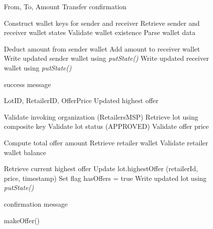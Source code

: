 \documentclass[12pt]{article}
\begin{document}
		\begin{figure}[h]
		\centering
		\caption{Baseline Algorithms Exhibiting MVCC Conflicts in Wallet Updates and Offer Management}
		\label{fig:transferandmakeoffer}
		
		\begin{minipage}[t]{0.48\linewidth}
			\vspace{0pt}
			\centering
			\begin{algorithm}[H]
				\caption{\texttt{\_transfer()}}
				\begin{algorithmic}[1]
					
					\Require From, To, Amount
					\Ensure Transfer confirmation
					
					\State Construct wallet keys for sender and receiver
					\State Retrieve sender and receiver wallet states
					\State Validate wallet existence
					\State Parse wallet data
					
					\State Deduct amount from sender wallet
					\State Add amount to receiver wallet
					\State Write updated sender wallet using \textit{putState()}
					\State Write updated receiver wallet using \textit{putState()}
					\EndIf
					
					\State \Return success message
					
				\end{algorithmic}
			\end{algorithm}
		\end{minipage}
		\hfill
		\begin{minipage}[t]{0.48\linewidth}
			\vspace{0pt}
			\centering
			\begin{algorithm}[H]
				\caption{makeOffer()}
				\begin{algorithmic}[1]
					
					\Require LotID, RetailerID, OfferPrice
					\Ensure Updated highest offer
					
					\State Validate invoking organization (RetailersMSP)
					\State Retrieve lot using composite key
					\State Validate lot status (APPROVED)
					\State Validate offer price
					
					\State Compute total offer amount
					\State Retrieve retailer wallet
					\State Validate retailer wallet balance
					
					\State Retrieve current highest offer
					\If{new offer is higher}
					\State Update lot.highestOffer (retailerId, price, timestamp)
					\State Set flag hasOffers = true
					\State Write updated lot using \textit{putState()}
					\EndIf
					
					\State \Return confirmation message
					
				\end{algorithmic}
			\end{algorithm}
		\end{minipage}
		
	\end{figure}
	
\end{document}
